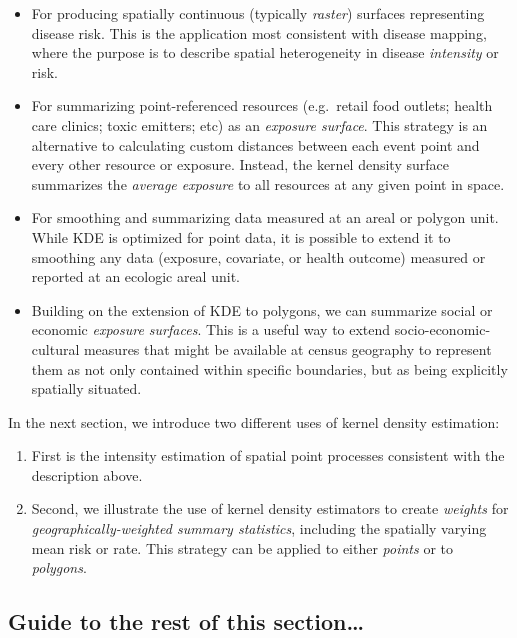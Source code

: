 \documentclass[
]{book}
\providecommand{\tightlist}{%
  \setlength{\itemsep}{0pt}\setlength{\parskip}{0pt}}
\begin{document}
\begin{itemize}
\tightlist
\item
  For producing spatially continuous (typically \emph{raster}) surfaces representing disease risk. This is the application most consistent with disease mapping, where the purpose is to describe spatial heterogeneity in disease \emph{intensity} or risk.
\item
  For summarizing point-referenced resources (e.g.~retail food outlets; health care clinics; toxic emitters; etc) as an \emph{exposure surface}. This strategy is an alternative to calculating custom distances between each event point and every other resource or exposure. Instead, the kernel density surface summarizes the \emph{average exposure} to all resources at any given point in space.
\item
  For smoothing and summarizing data measured at an areal or polygon unit. While KDE is optimized for point data, it is possible to extend it to smoothing any data (exposure, covariate, or health outcome) measured or reported at an ecologic areal unit.
\item
  Building on the extension of KDE to polygons, we can summarize social or economic \emph{exposure surfaces}. This is a useful way to extend socio-economic-cultural measures that might be available at census geography to represent them as not only contained within specific boundaries, but as being explicitly spatially situated.
\end{itemize}

In the next section, we introduce two different uses of kernel density estimation:

\begin{enumerate}
\def\labelenumi{\arabic{enumi}.}
\tightlist
\item
  First is the intensity estimation of spatial point processes consistent with the description above.
\item
  Second, we illustrate the use of kernel density estimators to create \emph{weights} for \emph{geographically-weighted summary statistics}, including the spatially varying mean risk or rate. This strategy can be applied to either \emph{points} or to \emph{polygons}.
\end{enumerate}

\hypertarget{guide-to-the-rest-of-this-section}{%
\subsection{Guide to the rest of this section\ldots{}}\label{guide-to-the-rest-of-this-section}}
\end{document}
